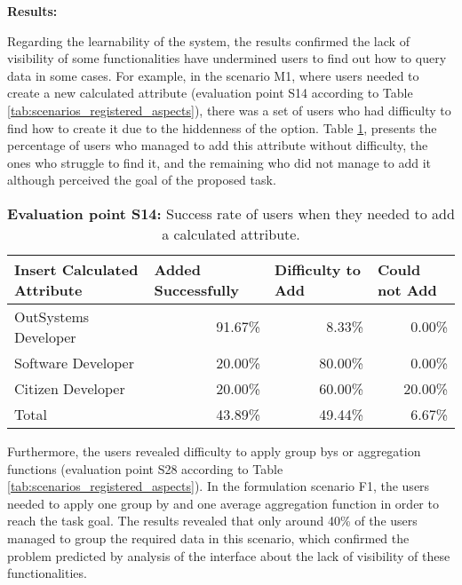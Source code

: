 \medskip
\textbf{Results:}
\medskip

Regarding the learnability of the system, the results confirmed the lack of visibility of some functionalities have undermined users to find out how to query data in some cases. For example, in the scenario M1, where users needed to create a new calculated attribute (evaluation point S14 according to Table \ref{tab:scenarios_registered_aspects}), there was a set of users who had difficulty to find how to create it due to the hiddenness of the option. Table \ref{tab:existingInterfaceCalculatedAttribute}, presents the percentage of users who managed to add this attribute without difficulty, the ones who struggle to find it, and the remaining who did not manage to add it although perceived the goal of the proposed task.

\begin{table}[tb]
    \caption{\textbf{Evaluation point S14:} Success rate of users when they needed to add a calculated attribute.}
    \label{tab:existingInterfaceCalculatedAttribute}
    \begin{tabular}{@{}lrrr@{}}
    \toprule
    \textbf{Insert Calculated Attribute} & \multicolumn{1}{l}{Added Successfully} & \multicolumn{1}{l}{Difficulty to Add} & \multicolumn{1}{l}{Could not Add} \\ \midrule
    OutSystems Developer                 & 91.67\%                                & 8.33\%                                & 0.00\%                          \\
    Software Developer                   & 20.00\%                                & 80.00\%                               & 0.00\%                          \\
    Citizen Developer                    & 20.00\%                                & 60.00\%                               & 20.00\%                         \\
    Total                                & 43.89\%                                & 49.44\%                               & 6.67\%                          \\ \bottomrule
    \end{tabular}
    \end{table}

Furthermore, the users revealed difficulty to apply group bys or aggregation functions (evaluation point S28 according to Table \ref{tab:scenarios_registered_aspects}). In the formulation scenario F1, the users needed to apply one group by and one average aggregation function in order to reach the task goal. The results revealed that only around 40\% of the users managed to group the required data in this scenario, which confirmed the problem predicted by analysis of the interface about the lack of visibility of these functionalities.

